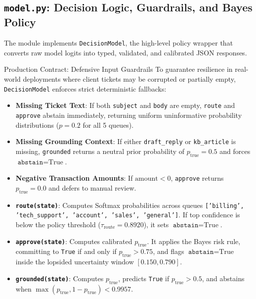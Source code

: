 \documentclass[11pt,a4paper]{article}
\begin{document}
\subsection{\texttt{model.py}: Decision Logic, Guardrails, and Bayes Policy}
The  module implements \texttt{DecisionModel}, the high-level policy wrapper that converts raw model logits into typed, validated, and calibrated JSON responses.

\begin{tipbox}{Production Contract: Defensive Input Guardrails}
To guarantee resilience in real-world deployments where client tickets may be corrupted or partially empty, \texttt{DecisionModel} enforces strict deterministic fallbacks:
\begin{itemize}
  \item \textbf{Missing Ticket Text}: If both \texttt{subject} and \texttt{body} are empty, \texttt{route} and \texttt{approve} abstain immediately, returning uniform uninformative probability distributions ($p = 0.2$ for all 5 queues).
  \item \textbf{Missing Grounding Context}: If either \texttt{draft\_reply} or \texttt{kb\_article} is missing, \texttt{grounded} returns a neutral prior probability of $p_{\text{true}} = 0.5$ and forces $\texttt{abstain} = \text{True}$.
  \item \textbf{Negative Transaction Amounts}: If $\text{amount} < 0$, \texttt{approve} returns $p_{\text{true}} = 0.0$ and defers to manual review.
\end{itemize}
\end{tipbox}

\begin{itemize}
  \item \textbf{\texttt{route(state)}}: Computes Softmax probabilities across queues \texttt{['billing', 'tech\_support', 'account', 'sales', 'general']}. If top confidence is below the policy threshold ($\tau_{\text{route}} = 0.8920$), it sets $\texttt{abstain} = \text{True}$.
  \item \textbf{\texttt{approve(state)}}: Computes calibrated $p_{\text{true}}$. It applies the Bayes risk rule, committing to \texttt{True} if and only if $p_{\text{true}} > 0.75$, and flags $\texttt{abstain} = \text{True}$ inside the lopsided uncertainty window $[0.150, 0.790]$.
  \item \textbf{\texttt{grounded(state)}}: Computes $p_{\text{true}}$, predicts \texttt{True} if $p_{\text{true}} > 0.5$, and abstains when $\max(p_{\text{true}}, 1 - p_{\text{true}}) < 0.9957$.
\end{itemize}
\end{document}
